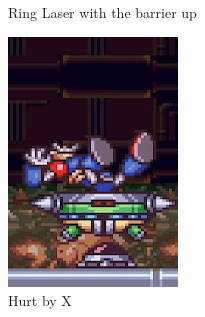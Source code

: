 \begin{figure}[htp]
\begin{minipage}{0.255\linewidth}
\begin{subfigure}[t]{\linewidth}
			\caption{Ring Laser with the barrier up}
		\end{subfigure}
	\end{minipage}
	\begin{subfigure}{0.25\linewidth}
		\centering
		\includegraphics[width=\linewidth]{figures/X2/Hunter_stages/Serges_hurt.png}
		\caption{Hurt by X}
	\end{subfigure}
	\begin{subfigure}{0.25\linewidth}
		\centering

\end{subfigure}
\end{figure}
